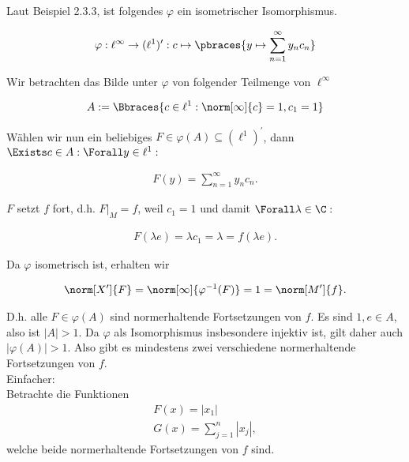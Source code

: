 \begin{solution}
\begin{enumerate}
\end{enumerate}

Laut Beispiel 2.3.3, ist folgendes $\varphi$ ein isometrischer Isomorphismus.

\begin{align*}
  \varphi:
  \ell^\infty \to (\ell^1)^\prime:
  c \mapsto
  \pbraces
  {
    y \mapsto
    \sum_{n = 1}^\infty y_n c_n
  }
\end{align*}

Wir betrachten das Bilde unter $\varphi$ von folgender Teilmenge von $\ell^\infty$

\begin{align*}
  A :=
  \Bbraces
  {
    c \in \ell^1:
    \norm[\infty]{c} = 1,  c_1 = 1
  }
\end{align*}

Wählen wir nun ein beliebiges $F \in \varphi(A) \subseteq (\ell^1)^\prime$, dann $\Exists c \in A: \Forall y \in \ell^1:$

\begin{align*}
  F(y)
  =
  \sum_{n=1}^\infty y_n c_n.
\end{align*}

$F$ setzt $f$ fort, d.h. $F|_M = f$, weil $c_1 = 1$ und damit $\Forall \lambda \in \C:$

\begin{align*}
  F(\lambda e)
  =
  \lambda c_1
  =
  \lambda
  =
  f(\lambda e).
\end{align*}

Da $\varphi$ isometrisch ist, erhalten wir

\begin{align*}
  \norm[X^\prime]{F}
  =
  \norm[\infty]{\varphi^{-1}(F)}
  =
  1
  =
  \norm[M^\prime]{f}.
\end{align*}

D.h. alle $F \in \varphi(A)$ sind normerhaltende Fortsetzungen von $f$.
Es sind $1, e \in A$, also ist $|A| > 1$.
Da $\varphi$ als Isomorphismus insbesondere injektiv ist, gilt daher auch $|\varphi(A)| > 1$.
Also gibt es mindestens zwei verschiedene normerhaltende Fortsetzungen von $f$.
\\
Einfacher: \\
Betrachte die Funktionen
\begin{align*}
  F(x) = |x_1| \\
  G(x) = \sum_{j=1}^n|x_j|,
\end{align*}
welche beide normerhaltende Fortsetzungen von $f$ sind.
\end{solution}

